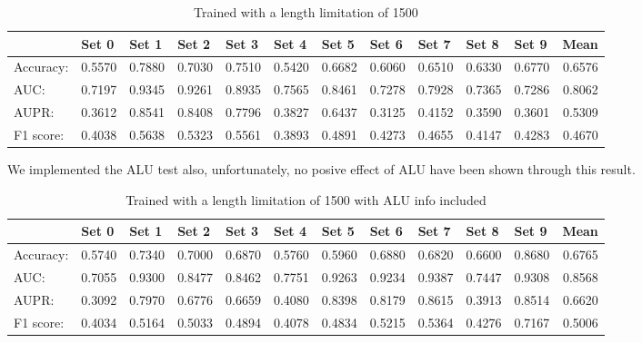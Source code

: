 \documentclass[10pt,a4paper]{article}
\begin{document}
\begin{spacing}{1.5}
		\begin{table}[H]
			\centering
			\caption{Trained with a length limitation of 1500}
			\begin{tabular}{l|rrrrrrrrrr|r}
				& \multicolumn{1}{l}{Set 0} & \multicolumn{1}{l}{Set 1} & \multicolumn{1}{l}{Set 2} & \multicolumn{1}{l}{Set 3} & \multicolumn{1}{l}{Set 4} & \multicolumn{1}{l}{Set 5} & \multicolumn{1}{l}{Set 6} & \multicolumn{1}{l}{Set 7} & \multicolumn{1}{l}{Set 8} & \multicolumn{1}{l}{Set 9} & \multicolumn{1}{l}{Mean} \\ \hline \hline
				Accuracy: & 0.5570  & 0.7880  & 0.7030  & 0.7510  & 0.5420  & 0.6682  & 0.6060  & 0.6510  & 0.6330  & 0.6770  & 0.6576  \\
				AUC:  & 0.7197  & 0.9345  & 0.9261  & 0.8935  & 0.7565  & 0.8461  & 0.7278  & 0.7928  & 0.7365  & 0.7286  & 0.8062  \\
				AUPR: & 0.3612  & 0.8541  & 0.8408  & 0.7796  & 0.3827  & 0.6437  & 0.3125  & 0.4152  & 0.3590  & 0.3601  & 0.5309  \\
				F1 score: & 0.4038  & 0.5638  & 0.5323  & 0.5561  & 0.3893  & 0.4891  & 0.4273  & 0.4655  & 0.4147  & 0.4283  & 0.4670  \\
			\end{tabular}%
			\label{tab:addlabel}%
		\end{table}%
		
		We implemented the ALU test also, unfortunately, no posive effect of ALU have been shown through this result.
		
		\begin{table}[H]
			\centering
			\caption{Trained with a length limitation of 1500 with ALU info included}
			\begin{tabular}{l|rrrrrrrrrr|r}
				& \multicolumn{1}{l}{Set 0} & \multicolumn{1}{l}{Set 1} & \multicolumn{1}{l}{Set 2} & \multicolumn{1}{l}{Set 3} & \multicolumn{1}{l}{Set 4} & \multicolumn{1}{l}{Set 5} & \multicolumn{1}{l}{Set 6} & \multicolumn{1}{l}{Set 7} & \multicolumn{1}{l}{Set 8} & \multicolumn{1}{l}{Set 9} & \multicolumn{1}{l}{Mean} \\ \hline \hline
				Accuracy: & 0.5740  & 0.7340  & 0.7000  & 0.6870  & 0.5760  & 0.5960  & 0.6880  & 0.6820  & 0.6600  & 0.8680  & 0.6765  \\
				AUC:  & 0.7055  & 0.9300  & 0.8477  & 0.8462  & 0.7751  & 0.9263  & 0.9234  & 0.9387  & 0.7447  & 0.9308  & 0.8568  \\
				AUPR: & 0.3092  & 0.7970  & 0.6776  & 0.6659  & 0.4080  & 0.8398  & 0.8179  & 0.8615  & 0.3913  & 0.8514  & 0.6620  \\
				F1 score: & 0.4034  & 0.5164  & 0.5033  & 0.4894  & 0.4078  & 0.4834  & 0.5215  & 0.5364  & 0.4276  & 0.7167  & 0.5006  \\
			\end{tabular}%
			\label{tab:addlabel}%
		\end{table}%
		

\end{spacing}
\end{document}
